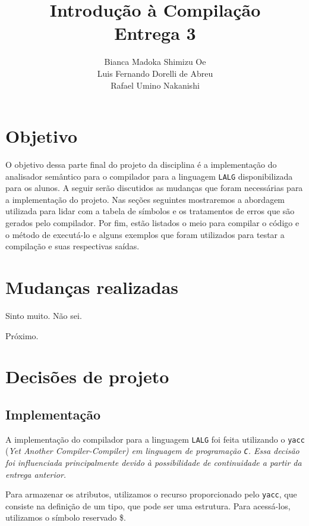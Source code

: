 \documentclass{article}
\title{Introdução à Compilação\\Entrega 3}
\author{Bianca Madoka Shimizu Oe\\
		Luis Fernando Dorelli de Abreu\\
		Rafael Umino Nakanishi}
\date{}
\begin{document}
\maketitle

\section{Objetivo} %
\label{sec:objetivo}
	O objetivo dessa parte final do projeto da disciplina é a implementação do analisador semântico para o compilador para a linguagem \verb=LALG= disponibilizada para os alunos. A seguir serão discutidos as mudanças que foram necessárias para a implementação do projeto. Nas seções seguintes mostraremos a abordagem utilizada para lidar com a tabela de símbolos e os tratamentos de erros que são gerados pelo compilador. Por fim, estão listados o meio para compilar o código e o método de executá-lo e alguns exemplos que foram utilizados para testar a compilação e suas respectivas saídas.


\section{Mudanças realizadas} %
\label{sec:mudancas_realizadas}
	Sinto muito. Não sei.

	Próximo.

\section{Decisões de projeto} %
\label{sec:decisoes_de_projeto}
	\subsection{Implementação} %
	\label{sub:implementacao}
		A implementação do compilador para a linguagem \verb=LALG= foi feita utilizando o \verb=yacc= (\em Yet Another Compiler-Compiler\normalfont) em linguagem de programação \verb=C=. Essa decisão foi influenciada principalmente devido à possibilidade de continuidade a partir da entrega anterior. 

		 Para armazenar os atributos, utilizamos o recurso proporcionado pelo \verb=yacc=, que consiste na definição de um tipo, que pode ser uma estrutura.
		 Para acessá-los, utilizamos o símbolo reservado \$.
		
\end{document}
